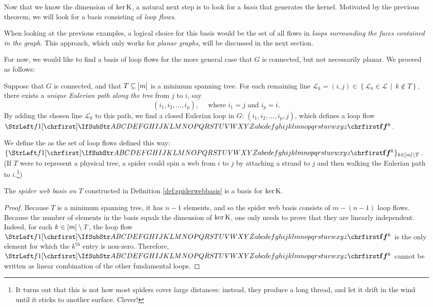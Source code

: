\documentclass[main.tex]{subfiles}
\begin{document}
Now that we know the dimension of $\ker \text{\textup{K}}$, a natural next step is to look for a \emph{basis} that generates the kernel. Motivated by the previous theorem, we will look for a basis consisting of \emph{loop flows}.

When looking at the previous examples, a logical choice for this basis would be the set of all flows in \emph{loops surrounding the faces contained in the graph}. This approach, which only works for \emph{planar graphs}, will be discussed in the next section.

For now, we would like to find a basis of loop flows for the more general case that $G$ is connected, but not necessarily planar. We proceed as follows:

\begin{definition}\label{def:spiderwebbasis}
Suppose that $G$ is connected, and that $T \subseteq [m]$ is a minimum spanning tree. For each remaining line $\mathcal{L}_k = (i,j) \in \left\lbrace \mathcal{L}_k \in \mathcal{L} \, \mid \, k \notin  T \right\rbrace $, there exists a \emph{unique Eulerian path along the tree} from $j$ to $i$, say 
\[
(i_1, i_2, \dots, i_p),\quad\text{ where $i_1=j$ and $i_p=i$.}
\]
By adding the chosen line $\mathcal{L}_k$ to this path, we find a closed Eulerian loop in $G$: $(i_1, i_2, \dots, i_p, j)$, which defines a loop flow $\mat{f}^k$. 

We define the  as the set of loop flows defined this way: $\{ \mat{f}^k \}_{k \in \range{m} \setminus T}$. (If $T$ were to represent a physical tree, a spider could spin a web from $i$ to $j$ by attaching a strand to $j$ and then walking the Eulerian path to $i$.\footnote{It turns out that this is not how most spiders cover large distances: instead, they produce a long thread, and let it drift in the wind until it sticks to another surface. Clever!})
\end{definition}

\begin{theorem}
The \emph{spider web basis on $T$} constructed in Definition \ref{def:spiderwebbasis} is a basis for $\ker \text{\textup{K}}$.
\end{theorem}
\begin{proof}
Because $T$ is a minimum spanning tree, it has $n-1$ elements, and so the spider web basis consists of $m - (n-1)$ loop flows.
Because the number of elements in the basis equals the dimension of $\ker \text{\textup{K}}$, one only needs to prove that they are linearly independent. Indeed, for each $k \in [m]\setminus T$, the loop flow $\mat{f}^k$ is the only element for which the $k^{\text{th}}$ entry is non-zero. Therefore, $\mat{f}^k$ cannot be written as linear combination of the other fundamental loops.
\end{proof}
\end{document}
